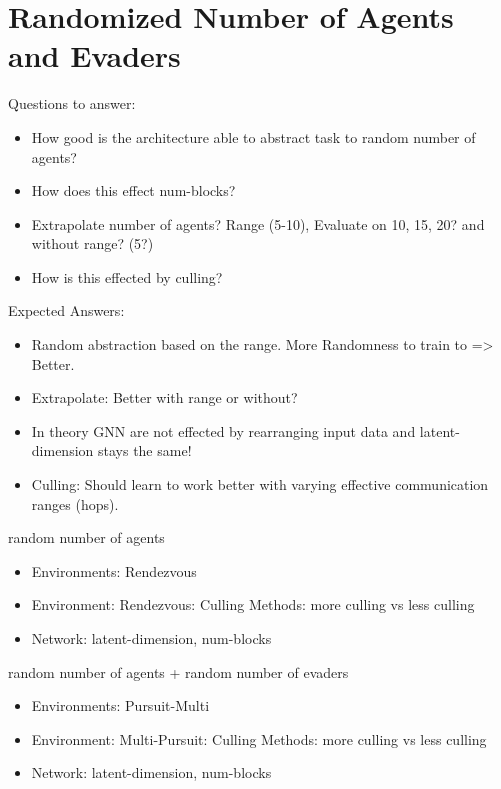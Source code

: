 \section{Randomized Number of Agents and Evaders}
Questions to answer:
\begin{itemize}[noitemsep,nolistsep]
    \item How good is the architecture able to abstract task to random number of agents?
    \item How does this effect num-blocks?
    \item Extrapolate number of agents? Range (5-10), Evaluate on 10, 15, 20? and without range? (5?)
    \item How is this effected by culling?
\end{itemize}
Expected Answers:
\begin{itemize}[noitemsep,nolistsep]
    \item Random abstraction based on the range. More Randomness to train to => Better.
    \item Extrapolate: Better with range or without? 
    \item In theory GNN are not effected by rearranging input data and latent-dimension stays the same!
    \item Culling: Should learn to work better with varying effective communication ranges (hops).
\end{itemize}
random number of agents
\begin{itemize}[noitemsep,nolistsep]
    \item Environments: Rendezvous
    \item Environment: Rendezvous: Culling Methods: more culling vs less culling
    \item Network: latent-dimension, num-blocks
\end{itemize}
random number of agents + random number of evaders
\begin{itemize}[noitemsep,nolistsep]
    \item Environments: Pursuit-Multi
    \item Environment: Multi-Pursuit: Culling Methods: more culling vs less culling
    \item Network: latent-dimension, num-blocks
\end{itemize}

